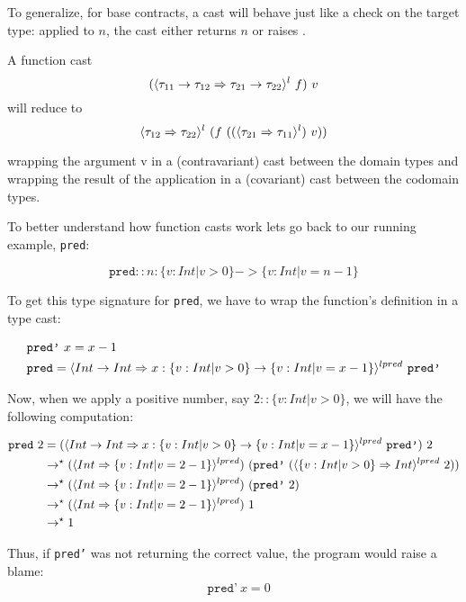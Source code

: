 To generalize, for base contracts, a cast will behave just like a check on the target type: 
applied to $n$, the cast either returns $n$ or raises  . 

A function cast 
$$
(\langle \tau_{11} \rightarrow \tau_{12} \Rightarrow \tau_{21} \rightarrow \tau_{22} \rangle^{l}
 \ f ) \ v
$$
will reduce to 
$$
\ecast{\tau_{12}}{\tau_{22}}{l}\ (f \ ((\ecast{\tau_{21}}{\tau_{11}}{l}) \ v))
$$

wrapping the argument v in a (contravariant) cast between the domain types
and wrapping the result of the application in a (covariant) cast between the
codomain types.

To better understand how function casts work lets go back to 
our running example, \texttt{pred}:

$$
\texttt{pred} ::n:\{v:Int | v > 0\} -> \{v:Int | v = n - 1\} 
$$

To get this type signature for \texttt{pred}, we have to wrap the function's definition 
in a type cast:

\begin{align*}
& \texttt{pred'}\ x= x - 1 \\
& \texttt{pred}  = \langle Int \rightarrow Int \Rightarrow x:\{v:Int | v > 0\} -> \{v:Int | v = x - 1\} \rangle^{lpred} \ \texttt{pred'}
\end{align*}


Now, when we apply a positive number, say $2 :: \{v:Int | v > 0\}$, we will have the following computation:

\begin{align*}
\texttt{pred}\ 2 &=
(\ecast{Int \rightarrow Int}{x:\{v:Int | v > 0\} -> \{v:Int | v = x - 1\}}{lpred} \ \texttt{pred'})\ 2 \\
&\rightarrow^\star (\ecast{Int}{\{v:Int | v = 2 - 1\}}{lpred}) \ (\texttt{pred'}\ (\ecast{\{v:Int | v > 0\}}{Int}{lpred} \ 2)) \\ 
&\rightarrow^\star (\ecast{Int}{\{v:Int | v = 2 - 1\}}{lpred}) \ (\texttt{pred'}\ 2) \\ 
&\rightarrow^\star (\ecast{Int}{\{v:Int | v = 2 - 1\}}{lpred}) \ 1 \\ 
&\rightarrow^\star 1 \\ 
\end{align*}

Thus, if \texttt{pred'} was not returning the correct value, the program would raise a blame:
\begin{align*}
& \texttt{pred'}\ x= 0 \\
\end{align*}


